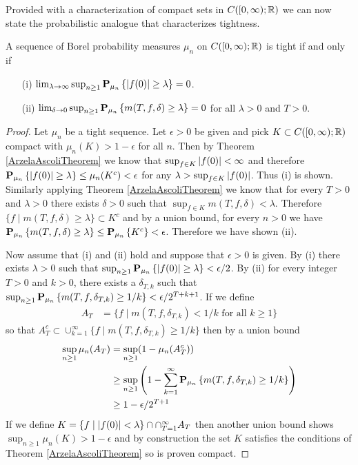 Provided with a characterization of compact sets in
$C([0,\infty); \reals)$ we can now state the probabilistic
analogue that characterizes tightness.
\begin{lem}\label{TightnessOfContinuousFunctions}A sequence of Borel probability measures $\mu_n$ on $C([0,\infty);
  \reals)$ is tight if and only if 
\begin{itemize}
\item[(i)]$\lim_{\lambda \to \infty} \sup_{n \geq 1} \sprobability{\abs{f(0)}
  \geq \lambda}{\mu_n} = 0$.
\item[(ii)] $\lim_{\delta \to 0} \sup_{n \geq 1} \sprobability{m(T, f,
  \delta) \geq \lambda}{\mu_n} = 0$ for all $\lambda > 0$ and $T > 0$.
\end{itemize}
\end{lem}
\begin{proof}
Let $\mu_n$ be a tight sequence.  Let $\epsilon > 0$ be given and pick
$K \subset C([0,\infty); \reals)$ compact with $\mu_n(K) >
1-\epsilon$ for all $n$.  Then by Theorem \ref{ArzelaAscoliTheorem} we know that $\sup_{f \in K}
\abs{f(0)} < \infty$ and therefore $\sprobability{\abs{f(0)}\geq
\lambda}{\mu_n} \leq \mu_n(K^c) < \epsilon$ for any $\lambda > \sup_{f
\in K} \abs{f(0)}$.  Thus (i) is shown.  Similarly applying Theorem \ref{ArzelaAscoliTheorem} we know that for
every $T > 0$ and $\lambda>0$
there exists $\delta>0$ such that $\sup_{f \in K} m(T, f, \delta) <
\lambda$.  Therefore $\lbrace f \mid m(T,f,\delta) \geq \lambda \rbrace
\subset K^c$ and by a union bound, for every $n>0$ we have $\sprobability{m(T,f,\delta) \geq
  \lambda}{\mu_n} \leq \sprobability{K^c}{\mu_n} < \epsilon$.
Therefore we have shown (ii).

Now assume that (i) and (ii) hold and suppose that $\epsilon > 0$ is
given.  By (i) there exists $\lambda > 0$ such that $\sup_{n \geq 1}
\sprobability{\abs{f(0)} \geq \lambda}{\mu_n} < \epsilon/2$.  By (ii)
for every integer $T > 0$ and $k > 0$, there exists a $\delta_{T,k}$
such that $\sup_{n \geq 1} \sprobability{m(T, f, \delta_{T,k}) \geq
  1/k}{\mu_n} < \epsilon/2^{T+k+1}$.  If we define 
\begin{align*}
A_T &= \lbrace f \mid 
m(T,f,\delta_{T,k}) < 1/k \text{ for all } k \geq 1\rbrace
\end{align*}
so that $A^c_T \subset \cup_{k=1}^\infty \lbrace f \mid m(T, f, \delta_{T,k}) \geq
  1/k \rbrace$ then by a union bound
\begin{align*}
\sup_{n \geq 1} \mu_n(A_T) &= \sup_{n \geq 1} (1 - \mu_n(A^c_T))\\
&\geq \sup_{n \geq 1} \left(1 - \sum_{k=1}^\infty \sprobability{m(T, f, \delta_{T,k}) \geq
  1/k}{\mu_n}\right ) \\
&\geq 1 - \epsilon/2^{T+1}
\end{align*}
If we define $K = \lbrace f \mid \abs{f(0)} < \lambda \rbrace \cap
\cap_{T=1}^\infty A_T$ then another union bound shows $\sup_{n \geq 1}
\mu_n(K) > 1 - \epsilon$ and by construction the set $K$ satisfies the
conditions of Theorem \ref{ArzelaAscoliTheorem} so is proven compact.  
\end{proof}

